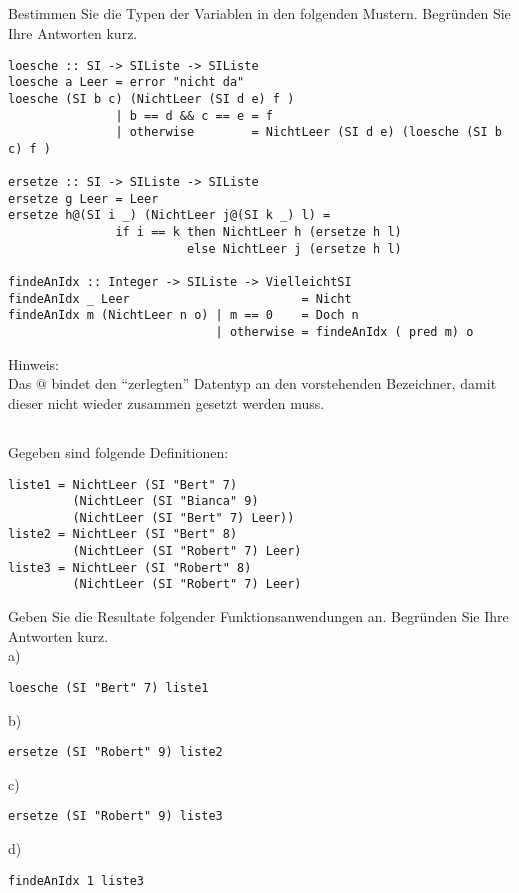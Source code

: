 \documentclass[
  10pt,                   %
  DIV12,
  german,                 %
  oneside,                %
  parskip=half,           %
  headings=normal,        %
  captions=tableheading,  %
]{scrartcl}
\begin{document}
\subsection{}
Bestimmen Sie die Typen der Variablen in den folgenden Mustern. Begründen Sie
Ihre Antworten kurz.
\begin{lstlisting}
loesche :: SI -> SIListe -> SIListe
loesche a Leer = error "nicht da"
loesche (SI b c) (NichtLeer (SI d e) f ) 
               | b == d && c == e = f
               | otherwise        = NichtLeer (SI d e) (loesche (SI b c) f )

ersetze :: SI -> SIListe -> SIListe
ersetze g Leer = Leer
ersetze h@(SI i _) (NichtLeer j@(SI k _) l) = 
               if i == k then NichtLeer h (ersetze h l)
                         else NichtLeer j (ersetze h l)
                                                        
findeAnIdx :: Integer -> SIListe -> VielleichtSI
findeAnIdx _ Leer                        = Nicht
findeAnIdx m (NichtLeer n o) | m == 0    = Doch n
                             | otherwise = findeAnIdx ( pred m) o
\end{lstlisting}
Hinweis:\\
Das $@$ bindet den "`zerlegten"' Datentyp an den vorstehenden Bezeichner, damit dieser nicht wieder zusammen gesetzt werden muss.
\subsection{}
Gegeben sind folgende Definitionen:
\begin{lstlisting}
liste1 = NichtLeer (SI "Bert" 7)
         (NichtLeer (SI "Bianca" 9)
         (NichtLeer (SI "Bert" 7) Leer))
liste2 = NichtLeer (SI "Bert" 8)
         (NichtLeer (SI "Robert" 7) Leer)
liste3 = NichtLeer (SI "Robert" 8)
         (NichtLeer (SI "Robert" 7) Leer)
\end{lstlisting}
Geben Sie die Resultate folgender Funktionsanwendungen an. Begründen Sie Ihre
Antworten kurz.\\
a) 
\begin{lstlisting}
loesche (SI "Bert" 7) liste1
\end{lstlisting}
b)
\begin{lstlisting}
ersetze (SI "Robert" 9) liste2
\end{lstlisting}
c)
\begin{lstlisting}
ersetze (SI "Robert" 9) liste3
\end{lstlisting}
d)
\begin{lstlisting}
findeAnIdx 1 liste3
\end{lstlisting}
\end{document}
